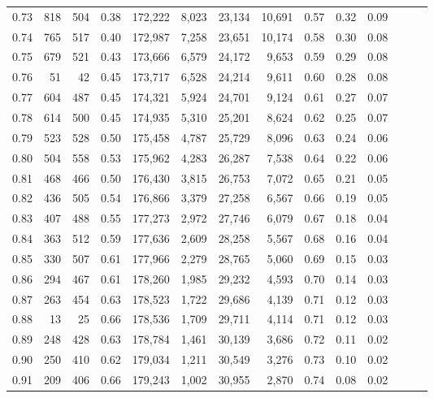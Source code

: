 \begin{tabular}{rrrrrrrrrrrrrr}
0.73 &    818 &  504 &  0.38 &  172,222 &    8,023 &  23,134 &  10,691 &  0.57 &  0.32 &      0.09 \\
0.74 &    765 &  517 &  0.40 &  172,987 &    7,258 &  23,651 &  10,174 &  0.58 &  0.30 &      0.08 \\
0.75 &    679 &  521 &  0.43 &  173,666 &    6,579 &  24,172 &   9,653 &  0.59 &  0.29 &      0.08 \\
0.76 &     51 &   42 &  0.45 &  173,717 &    6,528 &  24,214 &   9,611 &  0.60 &  0.28 &      0.08 \\
0.77 &    604 &  487 &  0.45 &  174,321 &    5,924 &  24,701 &   9,124 &  0.61 &  0.27 &      0.07 \\
0.78 &    614 &  500 &  0.45 &  174,935 &    5,310 &  25,201 &   8,624 &  0.62 &  0.25 &      0.07 \\
0.79 &    523 &  528 &  0.50 &  175,458 &    4,787 &  25,729 &   8,096 &  0.63 &  0.24 &      0.06 \\
0.80 &    504 &  558 &  0.53 &  175,962 &    4,283 &  26,287 &   7,538 &  0.64 &  0.22 &      0.06 \\
0.81 &    468 &  466 &  0.50 &  176,430 &    3,815 &  26,753 &   7,072 &  0.65 &  0.21 &      0.05 \\
0.82 &    436 &  505 &  0.54 &  176,866 &    3,379 &  27,258 &   6,567 &  0.66 &  0.19 &      0.05 \\
0.83 &    407 &  488 &  0.55 &  177,273 &    2,972 &  27,746 &   6,079 &  0.67 &  0.18 &      0.04 \\
0.84 &    363 &  512 &  0.59 &  177,636 &    2,609 &  28,258 &   5,567 &  0.68 &  0.16 &      0.04 \\
0.85 &    330 &  507 &  0.61 &  177,966 &    2,279 &  28,765 &   5,060 &  0.69 &  0.15 &      0.03 \\
0.86 &    294 &  467 &  0.61 &  178,260 &    1,985 &  29,232 &   4,593 &  0.70 &  0.14 &      0.03 \\
0.87 &    263 &  454 &  0.63 &  178,523 &    1,722 &  29,686 &   4,139 &  0.71 &  0.12 &      0.03 \\
0.88 &     13 &   25 &  0.66 &  178,536 &    1,709 &  29,711 &   4,114 &  0.71 &  0.12 &      0.03 \\
0.89 &    248 &  428 &  0.63 &  178,784 &    1,461 &  30,139 &   3,686 &  0.72 &  0.11 &      0.02 \\
0.90 &    250 &  410 &  0.62 &  179,034 &    1,211 &  30,549 &   3,276 &  0.73 &  0.10 &      0.02 \\
0.91 &    209 &  406 &  0.66 &  179,243 &    1,002 &  30,955 &   2,870 &  0.74 &  0.08 &      0.02 \\

\end{tabular}
